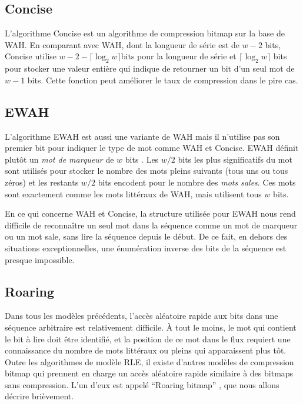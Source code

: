 \subsection{Concise}

L'algorithme Concise \citep{colantonio2010} est un algorithme de compression bitmap sur la base de WAH. En comparant avec WAH, dont la longueur de série est de $w-2$ bits, Concise utilise $w - 2 - \lceil \log_2 w \rceil$bits pour la longueur de série et $\lceil \log_2 w \rceil$ bits pour stocker une valeur entière qui indique de retourner un bit d'un seul mot de $w-1$ bits. Cette fonction peut améliorer le taux de compression dans le pire cas.

\subsection{EWAH}

L'algorithme EWAH \citep{lemire2010} est aussi une variante de WAH mais il n'utilise pas son premier bit pour indiquer le type de mot comme WAH et Concise. EWAH définit plutôt un \emph{mot de marqueur} de $w$ bits . Les $w/2$ bits les plus significatifs du mot sont utilisés pour stocker le nombre des mots pleins suivants (tous uns ou tous zéros) et les restants $w/2$ bits encodent pour le nombre des \emph{mots sales}. Ces mots sont exactement comme les mots littéraux de WAH, mais utilisent tous $w$ bits.

En ce qui concerne WAH et Concise, la structure utilisée pour EWAH nous rend difficile de reconnaître un seul mot dans la séquence comme un mot de marqueur ou un mot sale, sans lire la séquence depuis le début. De ce fait, en dehors des situations exceptionnelles, une énumération inverse des bits de la séquence est presque impossible.

\subsection{Roaring}

Dans tous les modèles précédents, l'accès aléatoire rapide aux bits dans une séquence arbitraire est relativement difficile. À tout le moins, le mot qui contient le bit à lire doit être identifié, et la position de ce mot dans le flux requiert une connaissance du nombre de mots littéraux ou pleins qui apparaissent plus tôt. Outre les algorithmes de modèle RLE, il existe d'autres modèles de compression bitmap qui prennent en charge un accès aléatoire rapide similaire à des bitmaps sans compression. L'un d'eux est appelé ``Roaring bitmap'' \citep{lemire2015}, que nous allons décrire brièvement.

